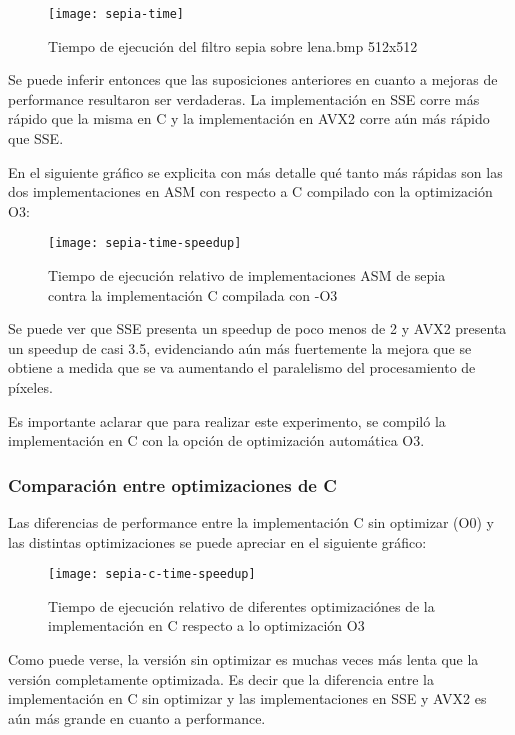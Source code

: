 \begin{figure}[h]
    \centering
    \texttt{[image: sepia-time]}
    \caption{Tiempo de ejecución del filtro sepia sobre lena.bmp 512x512}
    \label{fig:sepia-time}
\end{figure}

Se puede inferir entonces que las suposiciones anteriores en cuanto a mejoras de performance resultaron ser verdaderas. La implementación en SSE corre más rápido que la misma en C y la implementación en AVX2 corre aún más rápido que SSE.

En el siguiente gráfico se explicita con más detalle qué tanto más rápidas son las dos implementaciones en ASM con respecto a C compilado con la optimización O3:

\begin{figure}[h]
    \centering
    \texttt{[image: sepia-time-speedup]}
    \caption{Tiempo de ejecución relativo de implementaciones ASM de sepia contra la implementación C compilada con -O3}
    \label{fig:sepia-time-speedup}
\end{figure}

Se puede ver que SSE presenta un speedup de poco menos de 2 y AVX2 presenta un speedup de casi 3.5, evidenciando aún más fuertemente la mejora que se obtiene a medida que se va aumentando el paralelismo del procesamiento de píxeles.

Es importante aclarar que para realizar este experimento, se compiló la implementación en C con la opción de optimización automática O3.

\subsubsection{Comparación entre optimizaciones de C}

Las diferencias de performance entre la implementación C sin optimizar (O0) y las distintas optimizaciones se puede apreciar en el siguiente gráfico:

\begin{figure}[h]
    \centering
    \texttt{[image: sepia-c-time-speedup]}
    \caption{Tiempo de ejecución relativo de diferentes optimizaciónes de la implementación en C respecto a lo optimización O3}
    \label{fig:sepia-c-time}
\end{figure}

Como puede verse, la versión sin optimizar es muchas veces más lenta que la versión completamente optimizada. Es decir que la diferencia entre la implementación en C sin optimizar y las implementaciones en SSE y AVX2 es aún más grande en cuanto a performance.

